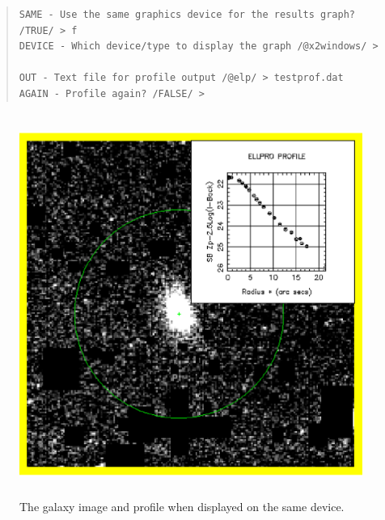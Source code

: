 \documentclass[twoside,11pt]{article}
\newenvironment{latexonly}{}{}
\newenvironment{myquote}{\begin{quote}\begin{small}}{\end{small}\end{quote}}
\begin{document}
\begin{myquote}
\begin{verbatim}
SAME - Use the same graphics device for the results graph? /TRUE/ > f
DEVICE - Which device/type to display the graph /@x2windows/ > 
 
OUT - Text file for profile output /@elp/ > testprof.dat
AGAIN - Profile again? /FALSE/ > 
\end{verbatim}
\end{myquote}

\begin{latexonly}
\begin{figure}[htlb]
\centering 
\includegraphics[height=125mm,width=125mm]{sun180_diag3.eps}
\caption{The galaxy image and profile when displayed on the same device.}
\end{figure}
\end{latexonly}
\end{document}
